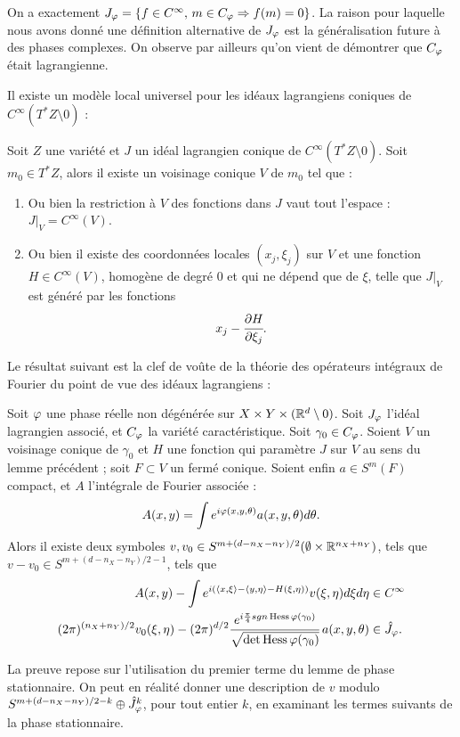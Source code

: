 On a exactement $J_{\varphi}=\{f \in C^{\infty},\, m \in C_{\varphi}\Rightarrow f(m)=0\}$. La raison pour laquelle nous avons donné une définition alternative de $J_{\varphi}$ est la généralisation future à des phases complexes. On observe par ailleurs qu'on vient de démontrer que $C_{\varphi}$ était lagrangienne.

Il existe un modèle local universel pour les idéaux lagrangiens coniques de $C^{\infty}(T^*Z \setminus 0)$ :
\begin{lem}
	Soit $Z$ une variété et $J$ un idéal lagrangien conique de $C^{\infty}(T^*Z \setminus 0)$. Soit $m_0\in T^*Z$, alors il existe un voisinage conique $V$ de $m_0$ tel que :
	\begin{enumerate}
		\item Ou bien la restriction à $V$ des fonctions dans $J$ vaut tout l'espace : $J|_V = C^{\infty}(V)$.
		\item Ou bien il existe des coordonnées locales $(x_j,\xi_j)$ sur $V$ et une fonction $H\in C^{\infty}(V)$, homogène de degré 0 et qui ne dépend que de $\xi$, telle que $J|_{V}$ est généré par les fonctions
		\begin{equation*}
			x_j-\cfrac{\partial H}{\partial \xi_j}.
		\end{equation*}
	\end{enumerate} 
\end{lem}

Le résultat suivant est la clef de voûte de la théorie des opérateurs intégraux de Fourier du point de vue des idéaux lagrangiens :

\begin{theorem}[Hormander]
	Soit $\varphi$ une phase réelle non dégénérée sur $X \times Y \times (\mathbb{R}^d \setminus 0)$. Soit $J_\varphi$ l'idéal lagrangien associé, et $C_{\varphi}$ la variété caractéristique. Soit $\gamma_0\in C_{\varphi}$. Soient $V$ un voisinage conique de $\gamma_0$ et $H$ une fonction qui paramètre $J$ sur $V$ au sens du lemme précédent ; soit $F \subset V$ un fermé conique. Soient enfin $a \in S^m(F)$ compact, et $A$ l'intégrale de Fourier associée :
	\begin{equation*}
		A(x,y)=\int e^{i\varphi(x,y,\theta)}a(x,y,\theta)d\theta.
	\end{equation*}
	Alors il existe deux symboles $v,v_0 \in S^{m + (d-n_X-n_Y)/2}(\emptyset \times \mathbb{R}^{n_X+n_Y})$, tels que $v-v_0 \in S^{m + (d-n_X-n_Y)/2-1}$, tels que 
	\begin{align*}
		A(x,y)-\int e^{i(\langle x,\xi\rangle-\langle y,\eta\rangle - H(\xi,\eta))}v(\xi,\eta)d\xi d\eta &\in C^{\infty}\\
		(2\pi)^{(n_X+n_Y)/2}v_0(\xi,\eta)-(2\pi)^{d/2}\cfrac{e^{i \frac{\pi}{4}sgn\operatorname{Hess} \varphi(\gamma_0)} }{\sqrt{\det\operatorname{Hess} \varphi (\gamma_0)}}\:a(x,y,\theta) &\in \hat{J}_{\varphi}.
	\end{align*}
\end{theorem}
La preuve repose sur l'utilisation du premier terme du lemme de phase stationnaire. On peut en réalité donner une description de $v$ modulo $S^{m + (d-n_X-n_Y)/2-k}\oplus \hat{J}_{\varphi}^k$, pour tout entier $k$, en examinant les termes suivants de la phase stationnaire.

